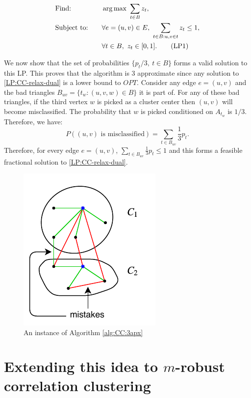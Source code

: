 \begin{alignat}{3} \label{LP:CC-relax-dual}
		&\text{Find: } && \operatorname*{arg\,max}\ \sum_{t \in B} z_t, \nonumber\\
		&\text{Subject to:} \quad && \forall e = (u,v) \in E ,\ \sum_{t \in B : u,v \in t} z_t \le 1, \nonumber\\
		& && \forall t \in B,\ z_{t} \in [ 0,1 ].\tag{LP1}
\end{alignat}

We now show that the set of probabilities $\{ p_t / 3,\ t \in B \}$ forms a valid solution to this LP. This proves that the algorithm is $3$ approximate since any solution to \ref{LP:CC-relax-dual} is a lower bound to $OPT$. Consider any edge $e = (u,v)$ and the bad triangles $B_{uv} = \{ t_w : (u,v,w) \in B \}$ it is part of. For any of these bad triangles, if the third vertex $w$ is picked as a cluster center then $(u,v)$ will become misclassified. The probability that $w$ is picked conditioned on $A_{t_w}$ is $1/3$. Therefore, we have:
\begin{equation} \label{eq:0000}
    P ( (u,v) \text{ is misclassified}) = \sum_{t \in B_{uv}} \frac{1}{3} p_t.
\end{equation}
Therefore, for every edge $e = (u,v)$, $\sum_{t \in B_{uv}} \frac{1}{3} p_t \le 1$ and this forms a feasible fractional solution to \ref{LP:CC-relax-dual}.

\begin{figure}[ht]
\centering
\includegraphics{./img/3apx.pdf}
\caption{An instance of Algorithm \ref{alg:CC:3apx}}
\label{fig:5}
\end{figure}

\section{Extending this idea to $m$-robust correlation clustering}

